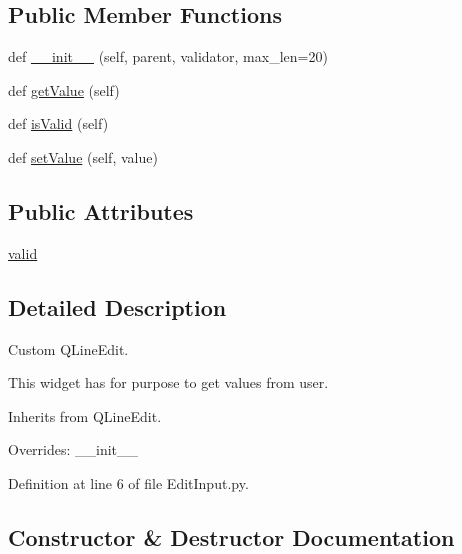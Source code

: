 \subsection*{Public Member Functions}
\begin{DoxyCompactItemize}
\item 
def \mbox{\hyperlink{classwindshape_1_1gui_1_1widgets_1_1inputs_1_1_edit_input_1_1_edit_input_aee4ec5bfb7c4fdd4d5bcf0a36ff65f52}{\+\_\+\+\_\+init\+\_\+\+\_\+}} (self, parent, validator, max\+\_\+len=20)
\item 
def \mbox{\hyperlink{classwindshape_1_1gui_1_1widgets_1_1inputs_1_1_edit_input_1_1_edit_input_aaf47986e36806c506bab5836f203259c}{get\+Value}} (self)
\item 
def \mbox{\hyperlink{classwindshape_1_1gui_1_1widgets_1_1inputs_1_1_edit_input_1_1_edit_input_acfcf54ed01630429e6ba3f238b04557d}{is\+Valid}} (self)
\item 
def \mbox{\hyperlink{classwindshape_1_1gui_1_1widgets_1_1inputs_1_1_edit_input_1_1_edit_input_aeb95521b6141384bd655a9be996284bb}{set\+Value}} (self, value)
\end{DoxyCompactItemize}
\subsection*{Public Attributes}
\begin{DoxyCompactItemize}
\item 
\mbox{\hyperlink{classwindshape_1_1gui_1_1widgets_1_1inputs_1_1_edit_input_1_1_edit_input_a6c8c431aa40800008cdd865bf17c711e}{valid}}
\end{DoxyCompactItemize}


\subsection{Detailed Description}
\begin{DoxyVerb}Custom QLineEdit.

This widget has for purpose to get values from user.

Inherits from QLineEdit.

Overrides: __init__
\end{DoxyVerb}
 

Definition at line 6 of file Edit\+Input.\+py.



\subsection{Constructor \& Destructor Documentation}
\mbox{\label{classwindshape_1_1gui_1_1widgets_1_1inputs_1_1_edit_input_1_1_edit_input_aee4ec5bfb7c4fdd4d5bcf0a36ff65f52}} 

